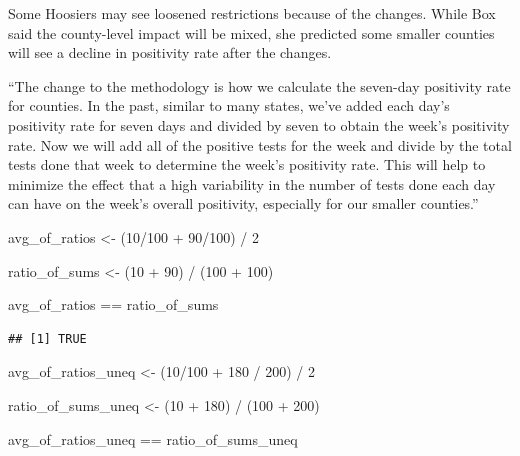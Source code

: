 \documentclass[
]{krantz}
\makeatletter
\newenvironment{Shaded}{\begin{snugshade}}{\end{snugshade}}
\newcommand{\DecValTok}[1]{\textcolor[rgb]{0.06,0.06,0.06}{#1}}
\newcommand{\NormalTok}[1]{#1}
\newcommand{\OtherTok}[1]{\textcolor[rgb]{0.37,0.37,0.37}{#1}}
\newcommand{\SpecialCharTok}[1]{\textcolor[rgb]{0,0,0}{#1}}
\renewenvironment{quote}{\begin{VF}}{\end{VF}}
\newenvironment{kframe}{%
\medskip{}
\setlength{\fboxsep}{.8em}
 \def\at@end@of@kframe{}%
 \ifinner\ifhmode%
  \def\at@end@of@kframe{\end{minipage}}%
  \begin{minipage}{\columnwidth}%
 \fi\fi%
 \def\FrameCommand##1{\hskip\@totalleftmargin \hskip-\fboxsep
 \colorbox{shadecolor}{##1}\hskip-\fboxsep
     \hskip-\linewidth \hskip-\@totalleftmargin \hskip\columnwidth}%
 \MakeFramed {\advance\hsize-\width
   \@totalleftmargin\z@ \linewidth\hsize
   \@setminipage}}%
 {\par\unskip\endMakeFramed%
 \at@end@of@kframe}
\renewenvironment{Shaded}{\begin{kframe}}{\end{kframe}}
\makeatother
\begin{document}
\begin{quote}
Some Hoosiers may see loosened restrictions because of the changes. While Box said the county-level impact will be mixed, she predicted some smaller counties will see a decline in positivity rate after the changes.
\end{quote}

\begin{quote}
``The change to the methodology is how we calculate the seven-day positivity rate for counties. In the past, similar to many states, we've added each day's positivity rate for seven days and divided by seven to obtain the week's positivity rate. Now we will add all of the positive tests for the week and divide by the total tests done that week to determine the week's positivity rate. This will help to minimize the effect that a high variability in the number of tests done each day can have on the week's overall positivity, especially for our smaller counties.''
\end{quote}

\begin{Shaded}
\begin{Highlighting}[]
\NormalTok{avg\_of\_ratios }\OtherTok{\textless{}{-}}\NormalTok{ (}\DecValTok{10}\SpecialCharTok{/}\DecValTok{100} \SpecialCharTok{+} \DecValTok{90}\SpecialCharTok{/}\DecValTok{100}\NormalTok{) }\SpecialCharTok{/} \DecValTok{2}

\NormalTok{ratio\_of\_sums }\OtherTok{\textless{}{-}}\NormalTok{ (}\DecValTok{10} \SpecialCharTok{+} \DecValTok{90}\NormalTok{) }\SpecialCharTok{/}\NormalTok{ (}\DecValTok{100} \SpecialCharTok{+} \DecValTok{100}\NormalTok{)}

\NormalTok{avg\_of\_ratios }\SpecialCharTok{==}\NormalTok{ ratio\_of\_sums}
\end{Highlighting}
\end{Shaded}

\begin{verbatim}
## [1] TRUE
\end{verbatim}

\begin{Shaded}
\begin{Highlighting}[]
\NormalTok{avg\_of\_ratios\_uneq }\OtherTok{\textless{}{-}}\NormalTok{ (}\DecValTok{10}\SpecialCharTok{/}\DecValTok{100} \SpecialCharTok{+} \DecValTok{180} \SpecialCharTok{/} \DecValTok{200}\NormalTok{) }\SpecialCharTok{/} \DecValTok{2}

\NormalTok{ratio\_of\_sums\_uneq }\OtherTok{\textless{}{-}}\NormalTok{ (}\DecValTok{10} \SpecialCharTok{+} \DecValTok{180}\NormalTok{) }\SpecialCharTok{/}\NormalTok{ (}\DecValTok{100} \SpecialCharTok{+} \DecValTok{200}\NormalTok{)}

\NormalTok{avg\_of\_ratios\_uneq }\SpecialCharTok{==}\NormalTok{ ratio\_of\_sums\_uneq}
\end{Highlighting}
\end{Shaded}
\end{document}
